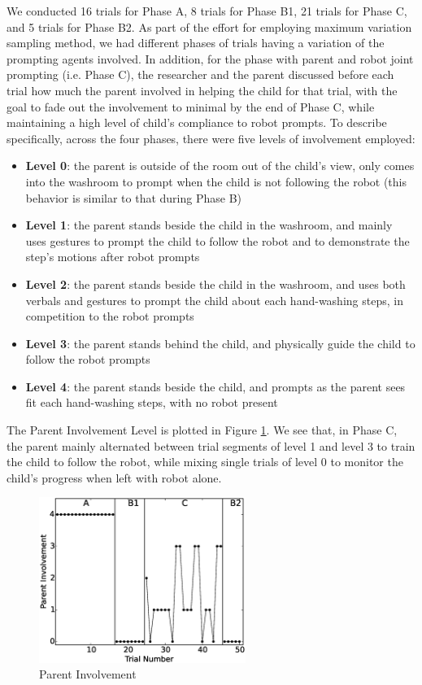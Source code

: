 \documentclass{ut-thesis}
\begin{document}
We conducted 16 trials for Phase A, 8 trials for Phase B1, 21 trials for Phase C, and 5 trials for Phase B2.  As part of the effort for employing maximum variation sampling method, we had different phases of trials having a variation of the prompting agents involved.  In addition, for the phase with parent and robot joint prompting (i.e. Phase C), the researcher and the parent discussed before each trial how much the parent involved in helping the child for that trial, with the goal to fade out the involvement to minimal by the end of Phase C, while maintaining a high level of child's compliance to robot prompts.  To describe specifically, across the four phases, there were five levels of involvement employed:
\begin{itemize}
	\item \textbf{Level 0}: the parent is outside of the room out of the child's view, only comes into the washroom to prompt when the child is not following the robot (this behavior is similar to that during Phase B)
	\item \textbf{Level 1}: the parent stands beside the child in the washroom, and mainly uses gestures to prompt the child to follow the robot and to demonstrate the step's motions after robot prompts
	\item \textbf{Level 2}: the parent stands beside the child in the washroom, and uses both verbals and gestures to prompt the child about each hand-washing steps, in competition to the robot prompts
	\item \textbf{Level 3}: the parent stands behind the child, and physically guide the child to follow the robot prompts
	\item \textbf{Level 4}: the parent stands beside the child, and prompts as the parent sees fit each hand-washing steps, with no robot present
\end{itemize}
The Parent Involvement Level is plotted in Figure \ref{fig:6ParentInvolvement}.  We see that, in Phase C, the parent mainly alternated between trial segments of level 1 and level 3 to train the child to follow the robot, while mixing single trials of level 0 to monitor the child's progress when left with robot alone.
\begin{figure} [h]
	\centering
	\includegraphics[width=0.6\textwidth]{./img/data_analysis/6ParentInvolvement.eps}
	\caption{Parent Involvement}
	\label{fig:6ParentInvolvement}
\end{figure}
\end{document}
